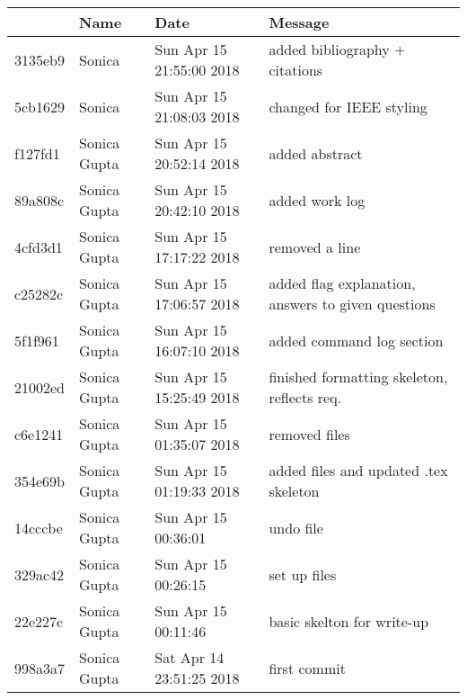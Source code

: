 \begin{table}[h]
\centering
\label{my-label}
\begin{tabular}{|l|l|l|l|}
\hline
        & Name         & Date                     & Message                                            \\ \hline
3135eb9 & Sonica       & Sun Apr 15 21:55:00 2018 & added bibliography + citations                     \\ \hline
5cb1629 & Sonica       & Sun Apr 15 21:08:03 2018 & changed for IEEE styling                           \\ \hline
f127fd1 & Sonica Gupta & Sun Apr 15 20:52:14 2018 & added abstract                                     \\ \hline
89a808c & Sonica Gupta & Sun Apr 15 20:42:10 2018 & added work log                                     \\ \hline
4cfd3d1 & Sonica Gupta & Sun Apr 15 17:17:22 2018 & removed a line                                     \\ \hline
c25282c & Sonica Gupta & Sun Apr 15 17:06:57 2018 & added flag explanation, answers to given questions \\ \hline
5f1f961 & Sonica Gupta & Sun Apr 15 16:07:10 2018 & added command log section                          \\ \hline
21002ed & Sonica Gupta & Sun Apr 15 15:25:49 2018 & finished formatting skeleton, reflects req.        \\ \hline
c6e1241 & Sonica Gupta & Sun Apr 15 01:35:07 2018 & removed files                                      \\ \hline
354e69b & Sonica Gupta & Sun Apr 15 01:19:33 2018 & added files and updated .tex skeleton              \\ \hline
14cccbe & Sonica Gupta & Sun Apr 15 00:36:01      & undo file                                          \\ \hline
329ac42 & Sonica Gupta & Sun Apr 15 00:26:15      & set up files                                       \\ \hline
22e227c & Sonica Gupta & Sun Apr 15 00:11:46      & basic skelton for write-up                         \\ \hline
998a3a7 & Sonica Gupta & Sat Apr 14 23:51:25 2018 & first commit                                       \\ \hline
\end{tabular}
\end{table}
